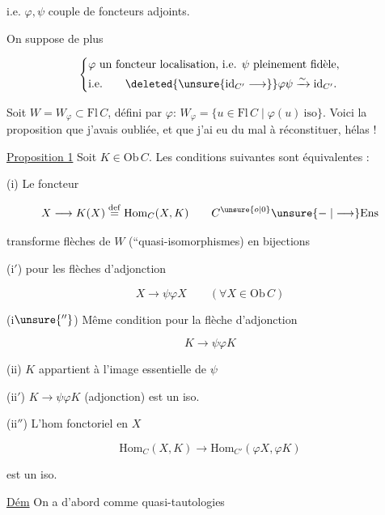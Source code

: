 i.e. $\varphi,\psi$ couple de foncteurs adjoints.

On suppose de plus

\[
 \left\{\begin{aligned}
 &\varphi\ \text{un foncteur localisation, i.e. }\psi\ \text{pleinement fidèle},\\
 &\text{i.e.}\qquad\deleted{\unsure{\mathrm{id}_{C'}\longrightarrow}}
  \varphi\psi\xrightarrow{\sim}\mathrm{id}_{C'} .
 \end{aligned}\right.
\]

Soit $W=W_{\varphi}\subset\mathrm{Fl}\,C$,  défini par $\varphi$: $W_\varphi=\{u\in\mathrm{Fl}\,C\mid\varphi(u)\ \mathrm{iso}\}$. Voici la proposition que j'avais oubliée, et que j'ai eu du mal à réconstituer, hélas !

\uline{Proposition 1} Soit $K\in\mathrm{Ob}\,C$. Les conditions suivantes  sont équivalentes :

(i) Le foncteur

\[
 X\longrightarrow K(X)\overset{\mathrm{def}}{=}\mathrm{Hom}_C(X,K)
 \qquad C^{\unsure{o|0}}\unsure{\relbar|\longrightarrow}\mathrm{Ens}
\]

transforme flèches de $W$ (``quasi-isomorphismes) en bijections

(i$'$)   pour les flèches d'adjonction

\[
 X\longrightarrow\psi\varphi X\qquad(\forall X\in\mathrm{Ob}\,C)
\]

(i$\unsure{''}$) Même condition pour la flèche d'adjonction

\[
 K\longrightarrow\psi\varphi K
\]


(ii) $K$ appartient à l'image essentielle de $\psi$

(ii$'$) $K\longrightarrow\psi\varphi K$ (adjonction) est un iso.

(ii$''$) L'hom fonctoriel en $X$

\[
 \mathrm{Hom}_C(X,K)\longrightarrow\mathrm{Hom}_{C'}(\varphi X,\varphi K)
\]

est un iso.

\uline{Dém} On a d'abord comme quasi-tautologies


